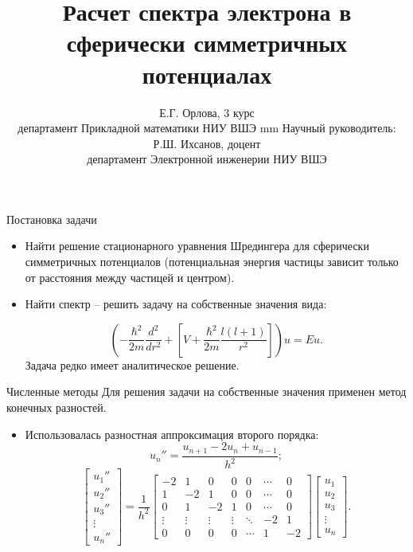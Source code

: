 \documentclass{beamer}
\author[E. Orlova]{Е.Г. Орлова, 3 курс\\
департамент Прикладной математики НИУ ВШЭ \vskip 2 mm
Научный руководитель: Р.Ш. Ихсанов, доцент\\
департамент Электронной инженерии НИУ ВШЭ}
\title[Расчет спектра электрона]{Расчет спектра электрона в сферически симметричных потенциалах}
\begin{document}
\begin{frame}
  \titlepage
\end{frame}

\begin{frame}{Постановка задачи}

	\begin{itemize}
        \item Найти решение стационарного уравнения Шредингера для сферически симметричных потенциалов (потенциальная энергия частицы зависит только от расстояния между частицей и центром).
        \item Найти спектр – решить задачу на собственные значения вида:
       
         $$(-\frac{\hbar^2}{2m}\frac{d^2 }{d r^2}+[V+\frac{\hbar^2}{2m}\frac{l(l+1)}{r^2}])u = Eu.$$
         Задача редко имеет аналитическое решение.
       
	 \end{itemize}

\end{frame}


\begin{frame}{Численные методы}
Для решения задачи на собственные значения применен метод конечных разностей.
   \vskip 2mm
    \begin{itemize}
    		\item Использовалась разностная аппроксимация второго порядка:
    		$$\displaystyle{{u_n''} = \frac{u_{n+1}-2u_n +u_{n-1}}{h^2}};$$  
    		$$\begin{bmatrix}
u_1'' \\
u_2'' \\
u_3'' \\
\vdots \\
u_n''
\end{bmatrix} = \frac{1}{h^2} \begin{bmatrix}
-2 & 1 &0&0&0& \cdots & 0 \\
1 & -2 & 1& 0&0&\cdots & 0 \\  
0&1 & -2 & 1& 0&\cdots & 0 \\  
\vdots & \vdots &\vdots & \vdots & \ddots & -2& 1  \\
0 & 0&0 &0& \cdots &1 & -2
\end{bmatrix}
\begin{bmatrix}
u_1
\\
u_2
\\
u_3
\\
\vdots
\\
u_n
\end{bmatrix}. $$
  
   \end{itemize}
    
\end{frame}
\end{document}
